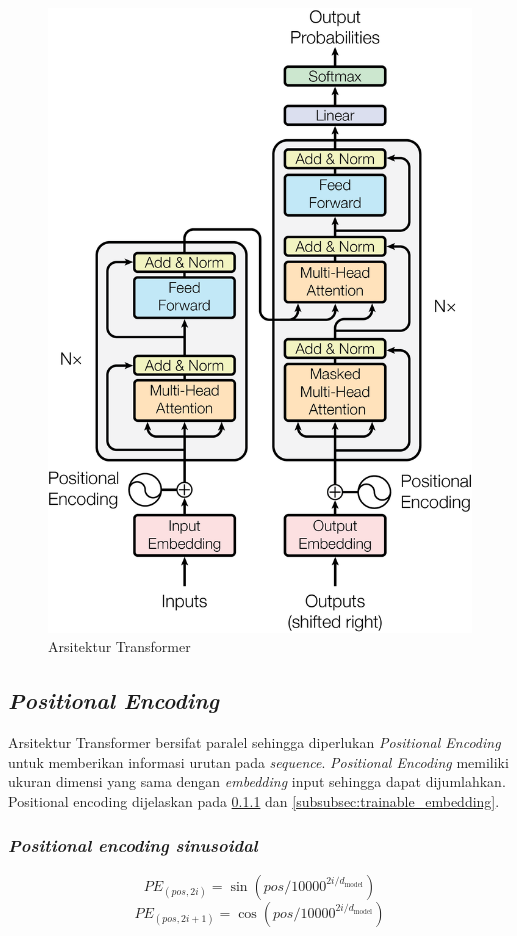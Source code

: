 \begin{figure}[H]
    \centering
    \includegraphics[width=0.5\linewidth]{gambar/ModalNet-21.png}
    \caption{Arsitektur Transformer}
    \label{fig:transformer}
\end{figure}

\subsection{\textit{Positional Encoding}}
Arsitektur Transformer bersifat paralel sehingga diperlukan \textit{Positional Encoding} untuk memberikan informasi urutan pada \textit{sequence}. \textit{Positional Encoding} memiliki ukuran dimensi yang sama dengan \textit{embedding} input sehingga dapat dijumlahkan. Positional encoding dijelaskan pada \ref{subsubsec:pos_enc_sin} dan \ref{subsubsec:trainable_embedding}.

\subsubsection{\textit{Positional encoding sinusoidal}}
\label{subsubsec:pos_enc_sin}
\begin{equation}
    PE_{(pos, 2i)} = \sin \left(pos / 10000^{2i/d_{\text{model}}}\right)
    \label{eq:1}
\end{equation}
\begin{equation}
    PE_{(pos, 2i+1)} = \cos \left(pos / 10000^{2i/d_{\text{model}}}\right)
    \label{eq:2}
\end{equation}


